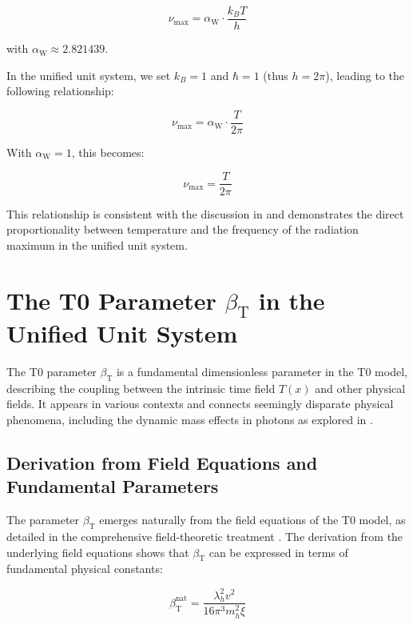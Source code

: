 \documentclass[12pt,a4paper]{article}
\newcommand{\Tfield}{T(x)}
\newcommand{\betaT}{\beta_{\text{T}}}
\newcommand{\alphaW}{\alpha_{\text{W}}}
\begin{document}
	\begin{equation}
		\label{eq:wien_law}
		\nu_{\text{max}} = \alphaW \cdot \frac{k_B T}{h}
	\end{equation}
	
	with \(\alphaW \approx 2.821439\).
	
	In the unified unit system, we set \(k_B = 1\) and \(\hbar = 1\) (thus \(h = 2\pi\)), leading to the following relationship:
	
	\begin{equation}
		\nu_{\text{max}} = \alphaW \cdot \frac{T}{2\pi}
	\end{equation}
	
	With \(\alphaW = 1\), this becomes:
	
	\begin{equation}
		\nu_{\text{max}} = \frac{T}{2\pi}
	\end{equation}
	
	This relationship is consistent with the discussion in \cite{pascher_temp_2025} and demonstrates the direct proportionality between temperature and the frequency of the radiation maximum in the unified unit system.
	
	\section{The T0 Parameter \(\betaT\) in the Unified Unit System}
	\label{sec:beta_t}
	
	The T0 parameter \(\betaT\) is a fundamental dimensionless parameter in the T0 model, describing the coupling between the intrinsic time field \(\Tfield\) and other physical fields. It appears in various contexts and connects seemingly disparate physical phenomena, including the dynamic mass effects in photons as explored in \cite{pascher_photons_2025}.
	
	\subsection{Derivation from Field Equations and Fundamental Parameters}
	\label{subsec:beta_derivation}
	
	The parameter \(\betaT\) emerges naturally from the field equations of the T0 model, as detailed in the comprehensive field-theoretic treatment \cite{pascher_photons_2025}. The derivation from the underlying field equations shows that \(\betaT\) can be expressed in terms of fundamental physical constants:
	
	\begin{equation}
		\betaT^{\text{nat}} = \frac{\lambda_h^2 v^2}{16\pi^3 m_h^2 \xi}
	\end{equation}
	
\end{document}

